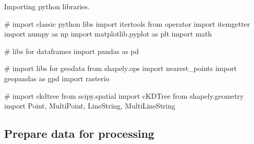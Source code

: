 \documentclass[]{article}
\newenvironment{Shaded}{}{}
\newcommand{\CommentTok}[1]{\textcolor[rgb]{0.00,0.50,0.00}{#1}}
\newcommand{\ImportTok}[1]{#1}
\newcommand{\NormalTok}[1]{#1}
\begin{document}
Importing python libraries.

\begin{Shaded}
\begin{Highlighting}[]
\CommentTok{# import classic python libs}
\ImportTok{import}\NormalTok{ itertools}
\ImportTok{from}\NormalTok{ operator }\ImportTok{import}\NormalTok{ itemgetter}
\ImportTok{import}\NormalTok{ numpy }\ImportTok{as}\NormalTok{ np}
\ImportTok{import}\NormalTok{ matplotlib.pyplot }\ImportTok{as}\NormalTok{ plt}
\ImportTok{import}\NormalTok{ math}

\CommentTok{# libs for dataframes}
\ImportTok{import}\NormalTok{ pandas }\ImportTok{as}\NormalTok{ pd}

\CommentTok{# import libs for geodata}
\ImportTok{from}\NormalTok{ shapely.ops }\ImportTok{import}\NormalTok{ nearest_points}
\ImportTok{import}\NormalTok{ geopandas }\ImportTok{as}\NormalTok{ gpd}
\ImportTok{import}\NormalTok{ rasterio}

\CommentTok{# import ckdtree}
\ImportTok{from}\NormalTok{ scipy.spatial }\ImportTok{import}\NormalTok{ cKDTree}
\ImportTok{from}\NormalTok{ shapely.geometry }\ImportTok{import}\NormalTok{ Point, MultiPoint, LineString, MultiLineString}
\end{Highlighting}
\end{Shaded}

\hypertarget{prepare-data-for-processing}{%
\subsection{Prepare data for processing}\label{prepare-data-for-processing}}
\end{document}
